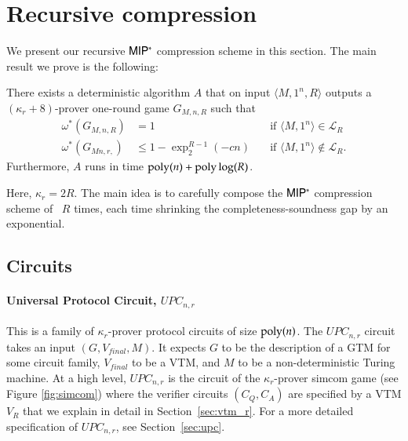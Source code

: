 
\section{Recursive compression}

We present our recursive ${\sf MIP^*}$ compression scheme in this section. The main result we prove is the following:

\begin{theorem}
	There exists a deterministic algorithm $A$ that on input $\langle M, 1^n, R \rangle$ outputs a $(\kappa_r + 8)$-prover one-round game $G_{M,n,R}$ such that 
\begin{align*}
		\omega^*(G_{M,n,R}) &= 1  \quad & \text{if } \langle M,1^n \rangle\in \mathcal{L}_R \\
		\omega^*(G_{Mn,r,}) &\leq 1 - \exp^{R-1}_2(-cn) \quad &\text{if } \langle M,1^n \rangle\notin \mathcal{L}_R.
\end{align*}
Furthermore, $A$ runs in time $\operatorname{poly}(n) + \operatorname{poly}\log(R)$.	
\end{theorem}

Here, $\kappa_r = 2R$.  The main idea is to carefully compose the ${\sf MIP^*}$ compression scheme of~\cite{ji2016compression} $R$ times, each time shrinking the completeness-soundness gap by an exponential. 



\subsection{Circuits}
\label{sec:circuits}

\paragraph{Universal Protocol Circuit, $UPC_{n,r}$} %
This is a family of $\kappa_r$-prover protocol circuits of size $\operatorname{poly}(n)$. The $UPC_{n,r}$ circuit takes an input $(G,V_{final},M)$. It expects $G$ to be the description of a GTM for some circuit family, $V_{final}$ to be a VTM, and $M$ to be a non-deterministic Turing machine. At a high level, $UPC_{n,r}$ is the circuit of the $\kappa_r$-prover simcom game (see Figure \ref{fig:simcom}) where the verifier circuits $(C_Q,C_A)$ are specified by a VTM $V_R$ that we explain in detail in Section~\ref{sec:vtm_r}. For a more detailed specification of $UPC_{n,r}$, see Section~\ref{sec:upc}.

